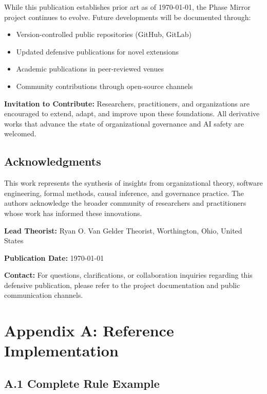 \documentclass[11pt,a4paper]{article}
\begin{document}
While this publication establishes prior art as of \today, the Phase Mirror project continues to evolve. Future developments will be documented through:

\begin{itemize}
\item Version-controlled public repositories (GitHub, GitLab)
\item Updated defensive publications for novel extensions
\item Academic publications in peer-reviewed venues
\item Community contributions through open-source channels
\end{itemize}

\textbf{Invitation to Contribute:} Researchers, practitioners, and organizations are encouraged to extend, adapt, and improve upon these foundations. All derivative works that advance the state of organizational governance and AI safety are welcomed.

\subsection{Acknowledgments}

This work represents the synthesis of insights from organizational theory, software engineering, formal methods, causal inference, and governance practice. The authors acknowledge the broader community of researchers and practitioners whose work has informed these innovations.

\textbf{Lead Theorist:} Ryan O. Van Gelder Theorist, Worthington, Ohio, United States

\textbf{Publication Date:} \today

\textbf{Contact:} For questions, clarifications, or collaboration inquiries regarding this defensive publication, please refer to the project documentation and public communication channels.

\section*{Appendix A: Reference Implementation}
\subsection*{A.1 Complete Rule Example}
\end{document}
